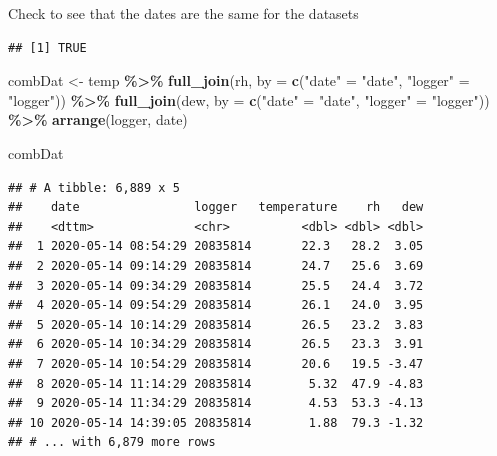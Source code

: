 \documentclass[]{article}
\newenvironment{Shaded}{\begin{snugshade}}{\end{snugshade}}
\newcommand{\DataTypeTok}[1]{\textcolor[rgb]{0.13,0.29,0.53}{#1}}
\newcommand{\KeywordTok}[1]{\textcolor[rgb]{0.13,0.29,0.53}{\textbf{#1}}}
\newcommand{\NormalTok}[1]{#1}
\newcommand{\OperatorTok}[1]{\textcolor[rgb]{0.81,0.36,0.00}{\textbf{#1}}}
\newcommand{\StringTok}[1]{\textcolor[rgb]{0.31,0.60,0.02}{#1}}
\begin{document}
Check to see that the dates are the same for the datasets

\begin{Shaded}
\end{Shaded}

\begin{verbatim}
## [1] TRUE
\end{verbatim}

\begin{Shaded}
\begin{Highlighting}[]
\NormalTok{combDat <{-}}\StringTok{ }\NormalTok{temp }\OperatorTok{\%>\%}\StringTok{ }
\StringTok{  }\KeywordTok{full\_join}\NormalTok{(rh,}
             \DataTypeTok{by =} \KeywordTok{c}\NormalTok{(}\StringTok{"date"}\NormalTok{ =}\StringTok{ "date"}\NormalTok{,}
                    \StringTok{"logger"}\NormalTok{ =}\StringTok{ "logger"}\NormalTok{)) }\OperatorTok{\%>\%}\StringTok{ }
\StringTok{  }\KeywordTok{full\_join}\NormalTok{(dew,}
            \DataTypeTok{by =} \KeywordTok{c}\NormalTok{(}\StringTok{"date"}\NormalTok{ =}\StringTok{ "date"}\NormalTok{,}
                    \StringTok{"logger"}\NormalTok{ =}\StringTok{ "logger"}\NormalTok{)) }\OperatorTok{\%>\%}\StringTok{ }
\StringTok{  }\KeywordTok{arrange}\NormalTok{(logger,}
\NormalTok{          date)}
\end{Highlighting}
\end{Shaded}

\begin{Shaded}
\begin{Highlighting}[]
\NormalTok{combDat}
\end{Highlighting}
\end{Shaded}

\begin{verbatim}
## # A tibble: 6,889 x 5
##    date                logger   temperature    rh   dew
##    <dttm>              <chr>          <dbl> <dbl> <dbl>
##  1 2020-05-14 08:54:29 20835814       22.3   28.2  3.05
##  2 2020-05-14 09:14:29 20835814       24.7   25.6  3.69
##  3 2020-05-14 09:34:29 20835814       25.5   24.4  3.72
##  4 2020-05-14 09:54:29 20835814       26.1   24.0  3.95
##  5 2020-05-14 10:14:29 20835814       26.5   23.2  3.83
##  6 2020-05-14 10:34:29 20835814       26.5   23.3  3.91
##  7 2020-05-14 10:54:29 20835814       20.6   19.5 -3.47
##  8 2020-05-14 11:14:29 20835814        5.32  47.9 -4.83
##  9 2020-05-14 11:34:29 20835814        4.53  53.3 -4.13
## 10 2020-05-14 14:39:05 20835814        1.88  79.3 -1.32
## # ... with 6,879 more rows
\end{verbatim}
\end{document}
